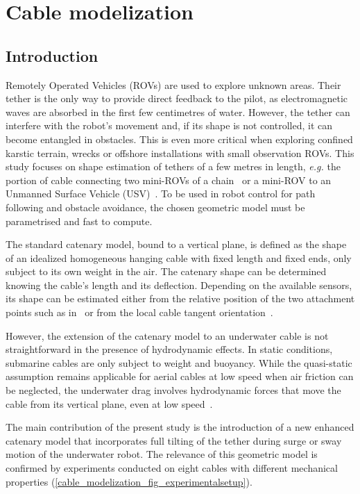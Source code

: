 \chapter{Cable modelization}

\section{Introduction}\label{cable_modelization_sec_introduction}

Remotely Operated Vehicles (ROVs) are used to explore unknown areas. Their tether is the only way
to provide direct feedback to the pilot, as electromagnetic waves are absorbed in the first few
centimetres of water. However, the tether can interfere with the robot's movement and, if its shape
is not controlled, it can become entangled in obstacles. This is even more critical when exploring
confined karstic terrain, wrecks or offshore installations with small observation ROVs. This study
focuses on shape estimation of tethers of a few metres in length, \textit{e.g.} the portion of
cable connecting two mini-ROVs of a chain~\cite{laranjeira2020a} or a mini-ROV to an Unmanned
Surface Vehicle (USV)~\cite{tortorici2019}. To be used in robot control for path following and
obstacle avoidance, the chosen geometric model must be parametrised and fast to compute.

The standard catenary model, bound to a vertical plane, is defined as the shape of an idealized
homogeneous hanging cable with fixed length and fixed ends, only subject to its own weight in the
air. The catenary shape can be determined knowing the cable’s length and its deflection. Depending
on the available sensors, its shape can be estimated either from the relative position of the two
attachment points such as in~\cite{dantonio2021, DAntonio2022} or from the local cable tangent
orientation~\cite{Dru_Dun2022b}.

However, the extension of the catenary model to an underwater cable is not straightforward in the
presence of hydrodynamic effects. In static conditions, submarine cables are only subject to weight
and buoyancy. While the quasi-static assumption remains applicable for aerial cables at low speed
when air friction can be neglected, the underwater drag involves hydrodynamic forces that move the
cable from its vertical plane, even at low speed~\cite{Dru_Dun2022a}.

The main contribution of the present study is the introduction of a new enhanced catenary model
that incorporates full tilting of the tether during surge or sway motion of the underwater robot.
The relevance of this geometric model is confirmed by experiments conducted on eight cables with
different mechanical properties (\cref{cable_modelization_fig_experimentalsetup}).

